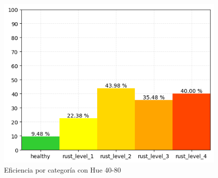 \begin{figure}
\centering
\includegraphics[scale=0.6]{images/result_classes_40_80.png}
\caption{Eficiencia por categoría con Hue 40-80}
\label{img:efficiency_categories_40_80}
\end{figure}
